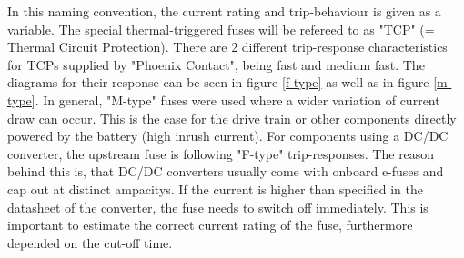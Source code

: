     In this naming convention, the current rating and trip-behaviour is given as a variable. The special thermal-triggered fuses will be refereed to as "TCP" (= Thermal Circuit Protection). There are 2 different trip-response characteristics for TCPs supplied by "Phoenix Contact", being fast and medium fast. The diagrams for their response can be seen in figure \ref{f-type} as well as in figure \ref{m-type}. In general, "M-type" fuses were used where a wider variation of current draw can occur. This is the case for the drive train or other components directly powered by the battery (high inrush current). For components using a DC/DC converter, the upstream fuse is following "F-type" trip-responses. The reason behind this is, that DC/DC converters usually come with onboard e-fuses and cap out at distinct ampacitys. If the current is higher than specified in the datasheet of the converter, the fuse needs to switch off immediately. This is important to estimate the correct current rating of the fuse, furthermore depended on the cut-off time. 

    \clearpage %

